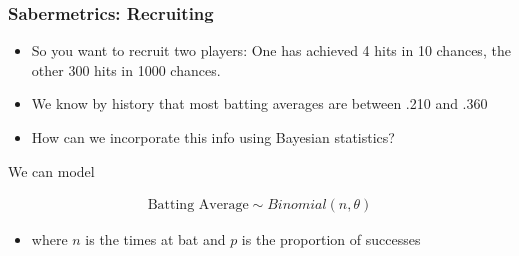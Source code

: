 \documentclass[
  shownotes,
  xcolor={svgnames},
  hyperref={colorlinks,citecolor=DarkBlue,linkcolor=DarkRed,urlcolor=DarkBlue}
  ]{beamer}
\begin{document}
\begin{frame}[fragile]
\frametitle{Sabermetrics: Recruiting}
\begin{itemize}
\item So you want to recruit two players: One has achieved 4 hits in 10 chances, the other 300 hits in 1000 chances.
\medskip
\item We know by history that most batting averages are between .210 and .360 
\medskip
\item How can we incorporate this info using Bayesian statistics?
\end{itemize}

We can model

\begin{align}
\text{Batting Average} \sim Binomial(n,\theta)
\end{align}

\begin{itemize}
\item where $n$ is the times at bat and $p$ is the proportion of successes
\end{itemize}

\end{frame}
\end{document}
